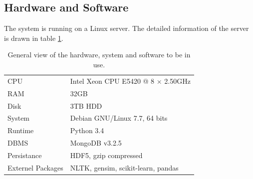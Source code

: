 \clearpage

\subsection{Hardware and Software}

The system is running on a Linux server. The detailed information of the server is drawn in table \ref{tab:pcinfo}.

\begin{table}[!htb]
\begin{tabular}{ll}
CPU & Intel Xeon CPU E5420 @ 8 $\times$ 2.50GHz \\
RAM & 32GB \\ 
Disk & 3TB HDD \\ 
System & Debian GNU/Linux 7.7, 64 bits \\ 
Runtime & Python 3.4 \\
DBMS & MongoDB v3.2.5\\ 
Persistance & HDF5, gzip compressed \\
Externel Packages & NLTK, gensim, scikit-learn, pandas \\
\end{tabular}
\caption{General view of the hardware, system and software to be in use. }
\label{tab:pcinfo}
\end{table}
